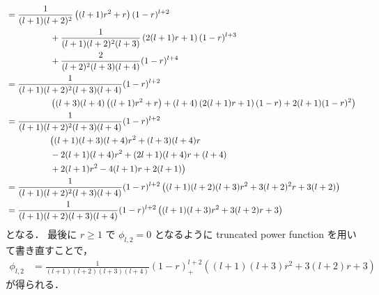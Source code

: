 \begin{align}
     & = \frac{1}{(l+1)(l+2)^2} \left( (l+1)r^2 + r \right) (1-r)^{l+2}
    \notag                                                                                                             \\
     & \hspace{5em}
    + \frac{1}{(l+1)(l+2)^2(l+3)} \left( 2(l+1)r + 1 \right) (1-r)^{l+3}
    \notag                                                                                                             \\
     & \hspace{5em}
    + \frac{2}{(l+2)^2(l+3)(l+4)} (1-r)^{l+4}
    \notag                                                                                                             \\
     & = \frac{1}{(l+1)(l+2)^2(l+3)(l+4)} (1-r)^{l+2}
    \notag                                                                                                             \\
     & \hspace{5em}
    \left( (l+3)(l+4) \left( (l+1)r^2 + r \right) + (l+4) \left( 2(l+1)r + 1 \right) (1-r)
    + 2(l+1) (1-r)^2 \right)
    \notag                                                                                                             \\
     & = \frac{1}{(l+1)(l+2)^2(l+3)(l+4)} (1-r)^{l+2}
    \notag                                                                                                             \\
     & \hspace{5em}
    \big( (l+1)(l+3)(l+4) r^2 + (l+3)(l+4)r
    \notag                                                                                                             \\
     & \hspace{5em}
    - 2(l+1)(l+4)r^2 + (2l+1)(l+4)r + (l+4)
    \notag                                                                                                             \\
     & \hspace{5em}
    + 2(l+1)r^2 - 4(l+1)r +2(l+1) \big)
    \notag                                                                                                             \\
     & = \frac{1}{(l+1)(l+2)^2(l+3)(l+4)} (1-r)^{l+2}
    \left( (l+1)(l+2)(l+3)r^2 + 3(l+2)^2r + 3(l+2) \right)
    \notag                                                                                                             \\
     & = \frac{1}{(l+1)(l+2)(l+3)(l+4)} (1-r)^{l+2}
    \left( (l+1)(l+3)r^2 + 3(l+2)r + 3 \right)
\end{align}
となる．
最後に $r \ge 1$ で $\phi_{l,2} = 0$ となるように truncated power function を用いて書き直すことで，
\begin{align}
    \phi_{l,2} & = \frac{1}{(l+1)(l+2)(l+3)(l+4)} (1 - r)_+^{l+2}
    \left( (l+1)(l+3)r^2 + 3(l+2)r + 3 \right)
\end{align}
が得られる．

